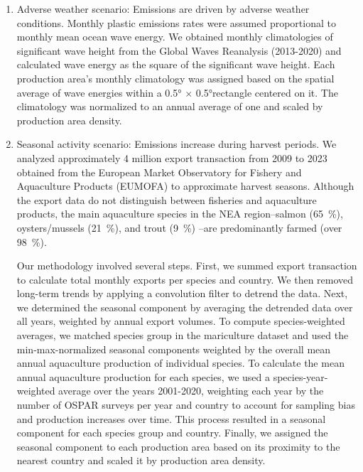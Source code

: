 \begin{enumerate}
    \item Adverse weather scenario: Emissions are driven by adverse weather conditions. Monthly plastic emissions rates were assumed proportional to monthly mean ocean wave energy. We obtained monthly climatologies of significant wave height  from the Global Waves Reanalysis \cite{eu_copernicus_marine_service_information_cmems_global_nodate} (2013-2020) and calculated wave energy as the square of the significant wave height. Each production area's monthly climatology was assigned based on the spatial average of wave energies within a \ang{0.5} $\times$ \ang{0.5}rectangle centered on it. The climatology was normalized to an annual average of one and scaled by production area density.
    \item Seasonal activity scenario: Emissions increase during harvest periods. We analyzed approximately 4 million export transaction from 2009 to 2023 obtained from the European Market Observatory for Fishery and Aquaculture Products \cite{eumofa_exports_2024} (EUMOFA) to approximate harvest seasons. Although the export data do not distinguish between fisheries and aquaculture products, the main aquaculture species in the NEA region--salmon (\qty{65}{\percent}), oysters/mussels (\qty{21}{\percent}), and trout (\qty{9}{\percent}) \cite{fao_global_2024}--are predominantly farmed (over \qty{98}{\percent}). 
    
    Our methodology involved several steps. First, we summed export transaction to calculate total monthly exports per species and country. We then removed long-term trends by applying a convolution filter to detrend the data. Next, we determined the seasonal component by averaging the detrended data over all years, weighted by annual export volumes. To compute species-weighted averages, we matched species group in the mariculture dataset \cite{clawson_mapping_2022} and used the min-max-normalized seasonal components weighted by the overall mean annual aquaculture production of individual species. To calculate the mean annual aquaculture production for each species, we used a species-year-weighted average over the years 2001-2020, weighting each year by the number of OSPAR surveys per year and country to account for sampling bias and production increases over time. This process resulted in a seasonal component for each species group and country. Finally, we assigned the seasonal component to each production area based on its proximity to the nearest country and scaled it by production area density.
\end{enumerate}

